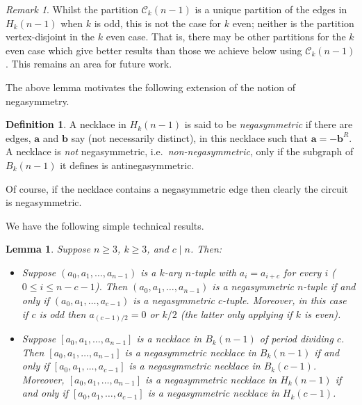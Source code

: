 \documentclass[a4paper,11pt]{article}
\theoremstyle{plain}
\newtheorem{lemma}{Lemma}[section]
\theoremstyle{definition}
\newtheorem{definition}{Definition}[section]
\theoremstyle{remark}
\newtheorem{remark}{Remark}[section]
\begin{document}
\begin{remark}  \label{remark:other_partitions}
Whilst the partition $\mathcal{C}_k(n-1)$ is a unique partition of the edges in $H_k(n-1)$ when $k$
is odd, this is not the case for $k$ even; neither is the partition vertex-disjoint in the $k$ even
case. That is, there may be other partitions for the $k$ even case which give better results than
those we achieve below using $\mathcal{C}_k(n-1)$. This remains an area
for future work.
\end{remark}

The above lemma motivates the following extension of the notion of negasymmetry.

\begin{definition}
A necklace in $H_k(n-1)$ is said to be \emph{negasymmetric} if there are edges, $\mathbf{a}$ and
$\mathbf{b}$ say (not necessarily distinct), in this necklace such that $\mathbf{a}=-\mathbf{b}^R$.
A necklace is \emph{not} negasymmetric, i.e.\ \emph{non-negasymmetric}, only if the subgraph of
$B_k(n-1)$ it defines is antinegasymmetric.
\end{definition}

Of course, if the necklace contains a negasymmetric edge then clearly the circuit is negasymmetric.

We have the following simple technical results.

\begin{lemma}  \label{lemma:nega_for_c}
Suppose $n\geq3$, $k\geq3$, and $c\mid n$.  Then:
\begin{itemize}
\item[(i)] Suppose $(a_0,a_1,\dots,a_{n-1})$ is a $k$-ary $n$-tuple with $a_{i}=a_{i+c}$ for
    every $i$ ($0\leq i\leq n-c-1$).  Then $(a_0,a_1,\dots,a_{n-1})$ is a negasymmetric
    $n$-tuple if and only if $(a_0,a_1,\dots,a_{c-1})$ is a negasymmetric $c$-tuple. Moreover,
    in this case if $c$ is odd then $a_{(c-1)/2}=0$ or $k/2$ (the latter only applying if $k$
    is even).
\item[(ii)] Suppose $[a_0,a_1,\dots,a_{n-1}]$ is a necklace in $B_k(n-1)$ of period dividing
    $c$. Then $[a_0,a_1,\dots,a_{n-1}]$ is a negasymmetric necklace in $B_k(n-1)$ if and only
    if $[a_0,a_1,\dots,a_{c-1}]$ is a negasymmetric necklace in $B_k(c-1)$. Moreover,
    $[a_0,a_1,\dots,a_{n-1}]$ is a negasymmetric necklace in $H_k(n-1)$ if and only if
    $[a_0,a_1,\dots,a_{c-1}]$ is a negasymmetric necklace in $H_k(c-1)$.
\end{itemize}
\end{lemma}
\end{document}
